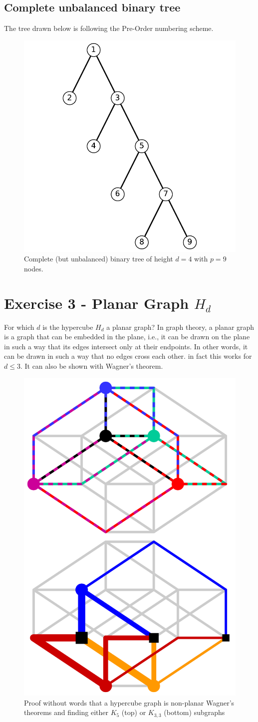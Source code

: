 \subsection{Complete unbalanced binary tree}
The tree drawn below is following the Pre-Order numbering scheme.

\begin{figure}[h]
    \begin{center}
        \includegraphics[width=0.3\linewidth]{figures/Ex1_2_c.pdf}
        \caption{Complete (but unbalanced) binary tree of height $d = 4$ with $p = 9$ nodes.}
    \end{center}
\end{figure}

\pagebreak

\section{Exercise 3 - Planar Graph $H_d$}
For which $d$ is the hypercube $H_d$ a planar graph? In graph theory, a planar graph is a graph that can be embedded in the plane, i.e., 
it can be drawn on the plane in such a way that its edges intersect only at their endpoints. In other words, it can be drawn in such a way 
that no edges cross each other. in fact this works for $d \le 3$. It can also be shown with Wagner's theorem.

\begin{figure}[h]
    \begin{center}
        \includegraphics[width=0.3\linewidth]{figures/Ex1_3.png}
        \caption{Proof without words that a hypercube graph is non-planar Wagner's theorems and finding either $K_5$ (top) or $K_{3,3}$ (bottom) subgraphs \cite{Wagners_theorem}}
    \end{center}
\end{figure}

